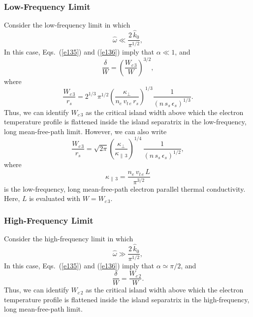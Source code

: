 \documentclass[12pt,prb,aps]{revtex4-1}
\begin{document}
\subsubsection{Low-Frequency Limit}
Consider the low-frequency limit in which
\begin{equation}
\hat{\omega}\ll \frac{2\,\hat{k}_0}{\pi^{1/2}},
\end{equation}
In this case, Eqs.~(\ref{e135}) and (\ref{e136}) imply that $\alpha\ll 1$, and
\begin{equation}
\frac{\delta}{W}= \left(\frac{W_{c\,3}}{W}\right)^{3/2},
\end{equation}
where\,\cite{rf}
\begin{equation}
\frac{W_{c\,3}}{r_s} =
2^{1/3}\,\pi^{1/2}\left(\frac{\kappa_\perp}{n_e\,v_{t\,e}\,r_s}\right)^{1/3}\frac{1}{(n\,s_s\,\epsilon_s)^{1/3}}.
\end{equation}
Thus, we
can identify $W_{c\,3}$ as the critical island width above which the electron temperature profile is flattened inside the island separatrix
in the  low-frequency, long mean-free-path limit. However, we can also write
\begin{equation}
\frac{W_{c\,3}}{r_s} =
\sqrt{2\pi}\left(\frac{\kappa_\perp}{\kappa_{\parallel\,3}}\right)^{1/4}\,\frac{1}{(n\,s_s\,\epsilon_s)^{1/2}},
\end{equation}
where
\begin{equation}
\kappa_{\parallel\,3} =\frac{n_e\,v_{t\,e}\,L}{\pi^{3/2}}
\end{equation}
is the low-frequency, long mean-free-path electron parallel thermal conductivity. Here, $L$ is evaluated with $W=W_{c\,3}$. 

\subsubsection{High-Frequency Limit}
Consider the high-frequency limit in which
\begin{equation}
\hat{\omega}\gg \frac{2\,\hat{k}_0}{\pi^{1/2}},
\end{equation}
In this case, Eqs.~(\ref{e135}) and (\ref{e136}) imply that $\alpha\simeq \pi/2$, and
\begin{equation}
 \frac{\delta}{W} = \frac{W_{c\,2}}{W}.
 \end{equation}
Thus, we
can identify $W_{c\,2}$ as the critical island width above which the electron temperature profile is flattened inside the island separatrix
in the  high-frequency, long mean-free-path limit.
\end{document}
